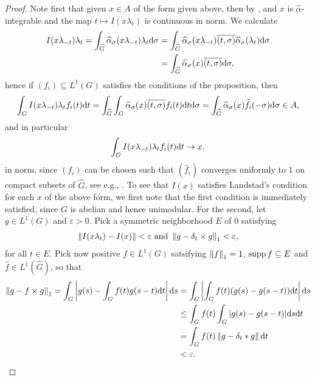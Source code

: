 \begin{proof}
	Note first that given $x \in A$ of the form given above, then by , and $x$ is $\hat \alpha$-integrable and the map $t \mapsto I(x \lambda_t)$ is continuous in norm. We calculate
	\begin{align}
		I(x\lambda_{-t}) \lambda_t = \int_{\widehat{G}} \widehat{\alpha}_\sigma(x \lambda_{-t}) \lambda_t \mathrm{d} \sigma &= \int_{\widehat{G}} \widehat{\alpha}_\sigma(x \lambda_{-t}) \overline{(t,\sigma)} \widehat{\alpha}_\sigma(\lambda_t) \mathrm{d} \sigma\\
		&= \int_{\widehat{G}} \widehat{\alpha}_\sigma(x) \overline{(t,\sigma)} \mathrm{d} \sigma,
		\label{eq:olpe1lemma2.8}
	\end{align}
	hence if $(f_i) \subseteq L^1(G)$ satisfies the conditions of the proposition, then
	\begin{align*}
		\int_{G}I(x \lambda_{-t}) \lambda_t f_i(t) \mathrm{d} t = \int_{\widehat{G}} \int_G \widehat{\alpha}_\sigma(x) \overline{(t,\sigma)} f_i(t) \mathrm{d} t \mathrm{d} \sigma = \int_{\widehat{G}} \widehat{\alpha}_\sigma (x) \widehat{f}_i(-\sigma) \mathrm{d} \sigma \in A,
	\end{align*}
	and in particular
	\begin{align*}
		\int_G I(x \lambda_{-t}) \lambda_t f_i(t) \mathrm{d} t \to x.
	\end{align*}
	in norm, since $(f_i)$ can be chosen such that $(\hat f_i)$ converges uniformly to $1$ on compact subsets of $\hat G$, see e.g., \cite[Lemma 4.38]{fourierproj}. To see that $I\left( x \right)$ satisfies Landstad's condition for each $x$ of the above form, we first note that the first condition is immediately satisfied, since $G$ is abelian and hence unimodular. For the second, let $g \in L^1(G)$ and $\varepsilon > 0$. Pick a symmetric neighborhood $E$ of $0$ satisfying
	\begin{align*}
		\left\lVert I(x \lambda_t) - I(x) \right\rVert<\varepsilon \text{ and } \left\lVert g - \delta_t \times g \right\rVert_1 < \varepsilon,
	\end{align*}
	for all $t \in E$. Pick now positive $f \in L^1(G)$ satsifying $\left\lVert f \right\rVert_1 = 1$, $\operatorname{supp} f \subseteq E$ and $\hat f \in L^1 (\hat G)$, so that
	\begin{align*}
		\left\lVert g - f \times g \right\rVert_1 = \int_G \left|g(s) - \int_G f(t) g(s-t) \mathrm{d} t\right| \mathrm{d} s &= \int_G \left | \int_G f(t)(g(s)-g(s-t)) \mathrm{d} t \right| \mathrm{d} s \\
		&\leq \int_G f(t) \int_G | g(s) - g(s-t)| \mathrm{d} s \mathrm{d} t\\
		& = \int_G f(t) \left\lVert g - \delta_t \ast g \right\rVert \mathrm{d} t \\
		&< \varepsilon.
	\end{align*}

\end{proof}
